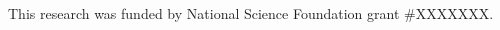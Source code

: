\documentclass[maize,portrait]{a0poster}
\begin{document}
\begin{multicols}{3}

  \nocite{*} %


  {\small This research was funded by National Science Foundation grant \#XXXXXXX.}
  
  
\end{multicols}
\end{document}
